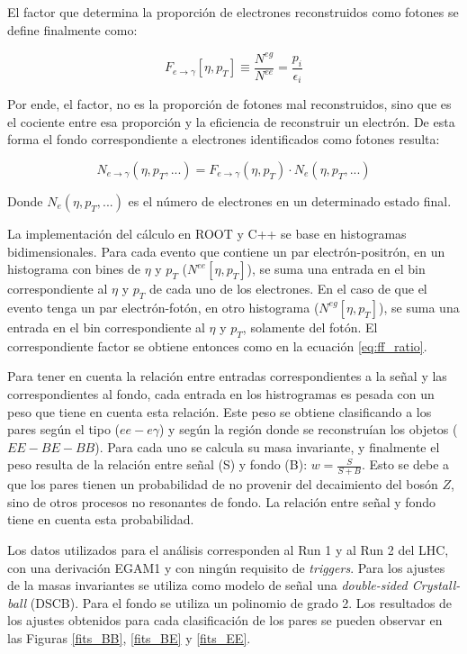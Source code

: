 El factor que determina la proporción de electrones reconstruidos como fotones se define finalmente como:

\begin{equation}
F_{e\rightarrow\gamma}[\eta , p_{T}]\equiv\frac{N^{eg}}{N^{ee}}=\frac{p_{i}}{\epsilon_{i}}
\end{equation}

Por ende, el factor, no es la proporción de fotones mal reconstruidos, sino que es el cociente entre esa proporción y la eficiencia de reconstruir un electrón. De esta forma el fondo correspondiente a electrones identificados como fotones resulta:

\begin{equation}
N_{e\rightarrow\gamma}(\eta , p_{T} , ... )=F_{e\rightarrow\gamma}(\eta , p_{T})\cdot N_{e}(\eta , p_{T} , ...)
\end{equation}
	
Donde $N_{e}(\eta , p_{T} , ...)$ es el número de electrones en un determinado estado final.

La implementación del cálculo en ROOT y C++ se  base en histogramas bidimensionales. Para cada evento que contiene un par electrón-positrón, en un histograma con bines de $\eta$ y $p_{T}$ ($N^{ee}[\eta , p_{T}]$), se suma una entrada en el bin correspondiente al $\eta$ y $p_{T}$ de cada uno de los electrones. En el caso de que el evento tenga un par electrón-fotón, en otro histograma ($N^{eg}[\eta , p_{T}]$), se suma una entrada en el bin correspondiente al $\eta$ y $p_{T}$, solamente del fotón. El correspondiente factor se obtiene entonces como en la ecuación \ref{eq:ff_ratio}.

Para tener en cuenta la relación entre entradas correspondientes a la señal y las correspondientes al fondo, cada entrada en los histrogramas es pesada con un peso que tiene en cuenta esta relación. Este peso se obtiene clasificando a los pares según el tipo ($ee-e\gamma$) y según la región donde se reconstruían los objetos ($EE-BE-BB$). Para cada uno se calcula su masa invariante, y finalmente el peso resulta de la relación entre señal (S) y fondo (B): $w=\frac{S}{S+B}$. Esto se debe a que los pares tienen un probabilidad de no provenir del decaimiento del bosón $Z$, sino de otros procesos no resonantes de fondo. La relación entre señal y fondo tiene en cuenta esta probabilidad.

Los datos utilizados para el análisis corresponden al Run 1 y al Run 2 del LHC, con una derivación EGAM1 y con ningún requisito de \textit{triggers}. Para los ajustes de la masas invariantes se utiliza como modelo de señal una \textit{double-sided Crystall-ball} (DSCB). Para el fondo se utiliza un polinomio de grado 2. Los resultados de los ajustes obtenidos para cada clasificación de los pares se pueden observar en las Figuras \ref{fits_BB}, \ref{fits_BE} y \ref{fits_EE}.

